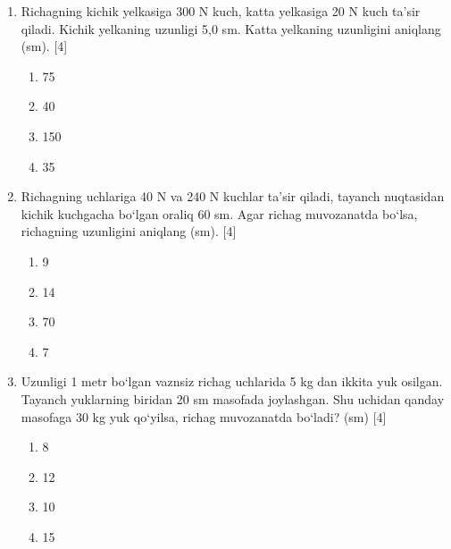 \begin{enumerate}

\begin{enumerate}[label=\Alph*)]
\item $M = Fd \cdot tg\alpha$
\item $M = Fd$
\item $M = Fd \cdot \cos\alpha$
\item $M = Fd \cdot \sin\alpha$
\end{enumerate}

\item Richagning kichik yelkasiga 300 N kuch, katta yelkasiga 20 N kuch ta’sir qiladi. Kichik yelkaning uzunligi 5,0 sm. Katta yelkaning uzunligini aniqlang (sm). [4]
\begin{enumerate}[label=\Alph*)]
\item 75
\item 40
\item 150
\item 35
\end{enumerate}

\item Richagning uchlariga 40 N va 240 N kuchlar ta’sir qiladi, tayanch nuqtasidan kichik kuchgacha bo‘lgan oraliq 60 sm. Agar richag muvozanatda bo‘lsa, richagning uzunligini aniqlang (sm). [4]
\begin{enumerate}[label=\Alph*)]
\item 9
\item 14
\item 70
\item 7
\end{enumerate}

\item Uzunligi 1 metr bo‘lgan vaznsiz richag uchlarida 5 kg dan ikkita yuk osilgan. Tayanch yuklarning biridan 20 sm masofada joylashgan. Shu uchidan qanday masofaga 30 kg yuk qo‘yilsa, richag muvozanatda bo‘ladi? (sm) [4]
\begin{enumerate}[label=\Alph*)]
\item 8
\item 12
\item 10
\item 15
\end{enumerate}


\end{enumerate}
